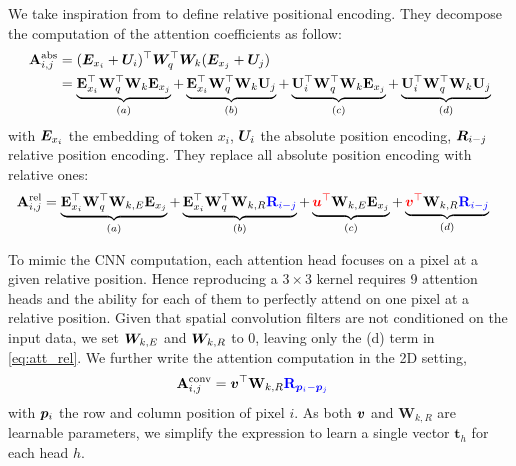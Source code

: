 \documentclass{article} %
\begin{document}
We take inspiration from \citep[TransformerXL]{dai2019transformerxl} to define relative positional encoding.
They decompose the computation of the attention coefficients as follow:
\begin{align}
    \mathbf{A}_{i, j}^{\mathrm{abs}} &= ({\bm{E}}_{x_i} + {\bm{U}}_i)^\top {\bm{W}}_q^\top {\bm{W}}_k ({\bm{E}}_{x_j} + {\bm{U}}_j)\\
 &=
  \underbrace{\mathbf{E}_{x_{i}}^{\top} \mathbf{W}_{q}^{\top} \mathbf{W}_{k} \mathbf{E}_{x_{j}}}_{(a)} 
  +
  \underbrace{\mathbf{E}_{x_{i}}^{\top} \mathbf{W}_{q}^{\top} \mathbf{W}_{k} \mathbf{U}_{j}}_{(b)}
  +
  \underbrace{\mathbf{U}_{i}^{\top} \mathbf{W}_{q}^{\top} \mathbf{W}_{k} \mathbf{E}_{x_{j}}}_{(c)}
  +
  \underbrace{\mathbf{U}_{i}^{\top} \mathbf{W}_{q}^{\top} \mathbf{W}_{k} \mathbf{U}_{j}}_{(d)}
\end{align}
with ${\bm{E}}_{x_i}$ the embedding of token $x_i$, ${\bm{U}}_i$ the absolute position encoding, ${\bm{R}}_{i-j}$ relative position encoding. They replace all absolute position encoding with relative ones:
\begin{align}
  \mathbf{A}_{i, j}^{\mathrm{rel}} &=
  \underbrace{\mathbf{E}_{x_{i}}^{\top} \mathbf{W}_{q}^{\top} \mathbf{W}_{k, E} \mathbf{E}_{x_{j}}}_{(a)}
  +
  \underbrace{\mathbf{E}_{x_{i}}^{\top} \mathbf{W}_{q}^{\top} \mathbf{W}_{k, R} {\color{blue} \mathbf{R}_{i-j}}}_{(b)}
  +
  \underbrace{{\color{red} {\bm{u}}^{\top}} \mathbf{W}_{k, E} \mathbf{E}_{x_{j}}}_{(c)}
  +
  \underbrace{{\color{red} {\bm{v}}^{\top}} \mathbf{W}_{k, R} {\color{blue} \mathbf{R}_{i-j}}}_{(d)}
  \label{eq:att_rel}
\end{align}

To mimic the CNN computation, each attention head focuses on a pixel at a given relative position.
Hence reproducing a $3\times 3$ kernel requires 9 attention heads and the ability for each of them to perfectly attend on
one pixel at a relative position.
Given that spatial convolution filters are not conditioned on the input data, we set ${\bm{W}}_{k, E}$ and ${\bm{W}}_{k, R}$ to 0, leaving only the (d) term in \eqref{eq:att_rel}.
We further write the attention computation in the 2D setting,
\begin{align}
  \mathbf{A}_{i, j}^{\mathrm{conv}} &= {\bm{v}}^{\top} \mathbf{W}_{k, R} {\color{blue} \mathbf{R}_{{\bm{p}}_i - {\bm{p}}_j}}
\end{align}
with ${\bm{p}}_i$ the row and column position of pixel $i$. As both ${\bm{v}}$ and $\mathbf{W}_{k, R}$ are learnable parameters, we simplify the expression to learn a single vector $\mathbf{t}_h$ for each head $h$.
\end{document}
